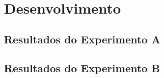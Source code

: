 \chapter{Desenvolvimento}
\label{chap:desenvolvimnto}


\section{Resultados do Experimento A}
\label{sec:resultados-do-experimento-a}



\section{Resultados do Experimento B}
\label{sec:resultados-do-experimento-b}


